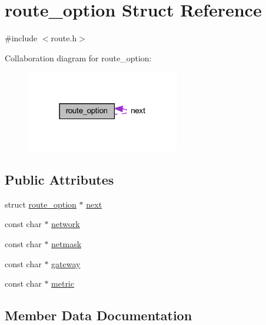 \hypertarget{structroute__option}{}\section{route\+\_\+option Struct Reference}
\label{structroute__option}


{\ttfamily \#include $<$route.\+h$>$}



Collaboration diagram for route\+\_\+option\+:
\nopagebreak
\begin{figure}[H]
\begin{center}
\leavevmode
\includegraphics[width=190pt]{structroute__option__coll__graph}
\end{center}
\end{figure}
\subsection*{Public Attributes}
\begin{DoxyCompactItemize}
\item 
struct \hyperlink{structroute__option}{route\+\_\+option} $\ast$ \hyperlink{structroute__option_a59bb896ca09285be598f7b7b40268225}{next}
\item 
const char $\ast$ \hyperlink{structroute__option_a20d3cd1c7fb854bc11dc3810296da268}{network}
\item 
const char $\ast$ \hyperlink{structroute__option_a25c5e0274ef737184473986fd12da8fd}{netmask}
\item 
const char $\ast$ \hyperlink{structroute__option_a8a16bc250f76b8421ba372b9e64b07ae}{gateway}
\item 
const char $\ast$ \hyperlink{structroute__option_ae4afe3a1e5520c08831cb234e4eaef03}{metric}
\end{DoxyCompactItemize}


\subsection{Member Data Documentation}
\hypertarget{structroute__option_a8a16bc250f76b8421ba372b9e64b07ae}{}
